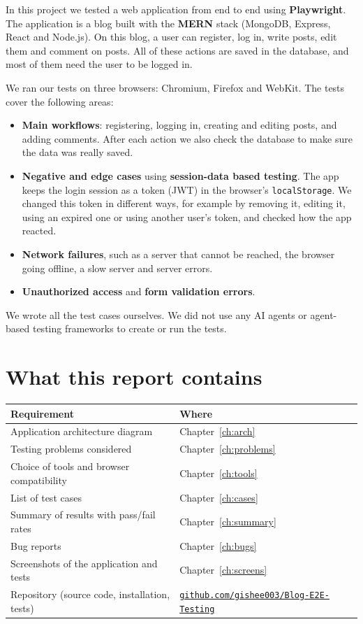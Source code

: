 \documentclass[12pt,a4paper,oneside]{report}
\newcommand{\repourl}{https://github.com/gishee003/Blog-E2E-Testing}
\newcommand{\code}[1]{\texttt{#1}}
\begin{document}
In this project we tested a web application from end to end using
\textbf{Playwright}. The application is a blog built with the \textbf{MERN}
stack (MongoDB, Express, React and Node.js). On this blog, a user can register,
log in, write posts, edit them and comment on posts. All of these actions are
saved in the database, and most of them need the user to be logged in.

We ran our tests on three browsers: Chromium, Firefox and WebKit. The tests
cover the following areas:

\begin{itemize}[nosep]
  \item \textbf{Main workflows}: registering, logging in, creating and editing
        posts, and adding comments. After each action we also check the
        database to make sure the data was really saved.
  \item \textbf{Negative and edge cases} using \textbf{session-data based
        testing}. The app keeps the login session as a token (JWT) in the
        browser's \code{localStorage}. We changed this token in different ways,
        for example by removing it, editing it, using an expired one or using
        another user's token, and checked how the app reacted.
  \item \textbf{Network failures}, such as a server that cannot be reached, the
        browser going offline, a slow server and server errors.
  \item \textbf{Unauthorized access} and \textbf{form validation errors}.
\end{itemize}

We wrote all the test cases ourselves. We did not use any AI agents or
agent-based testing frameworks to create or run the tests.

\section*{What this report contains}

\begin{tabularx}{\textwidth}{>{\raggedright\arraybackslash}p{6.2cm}X}
\toprule
\textbf{Requirement} & \textbf{Where} \\
\midrule
Application architecture diagram & Chapter~\ref{ch:arch} \\
Testing problems considered & Chapter~\ref{ch:problems} \\
Choice of tools and browser compatibility & Chapter~\ref{ch:tools} \\
List of test cases & Chapter~\ref{ch:cases} \\
Summary of results with pass/fail rates & Chapter~\ref{ch:summary} \\
Bug reports & Chapter~\ref{ch:bugs} \\
Screenshots of the application and tests & Chapter~\ref{ch:screens} \\
Repository (source code, installation, tests) & \href{\repourl}{\nolinkurl{github.com/gishee003/Blog-E2E-Testing}} \\
\bottomrule
\end{tabularx}
\end{document}
